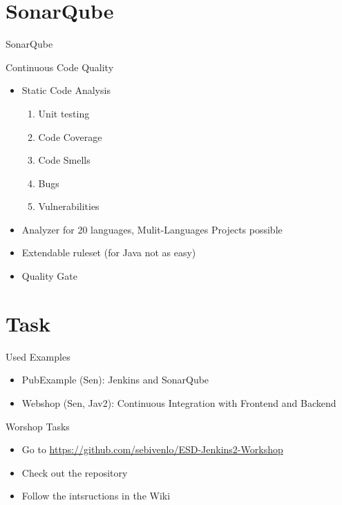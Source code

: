\documentclass[utf8, a4paper]{beamer}
\begin{document}
\section{SonarQube}

\begin{frame}
	{SonarQube}

Continuous Code Quality
\begin{itemize}
	\item Static Code Analysis
		\begin{enumerate}
			\item Unit testing
			\item Code Coverage
			\item Code Smells
			\item Bugs
			\item Vulnerabilities
		\end{enumerate}
	\item Analyzer for 20 languages, Mulit-Languages Projects possible
	\item Extendable ruleset (for Java not as easy)
	\item Quality Gate
\end{itemize}

\end{frame}

\section{Task}

\begin{frame}
	{Used Examples}
	
	\begin{itemize}
		\item PubExample (Sen): Jenkins and SonarQube
		\item Webshop (Sen, Jav2): Continuous Integration with Frontend and Backend
	\end{itemize}		
	
\end{frame}

\begin{frame}
	{Worshop Tasks}
	
	\begin{itemize}
		\item Go to \url{https://github.com/sebivenlo/ESD-Jenkins2-Workshop}
		\item Check out the repository
		\item Follow the intsructions in the Wiki
	\end{itemize}

\end{frame}
\end{document}
